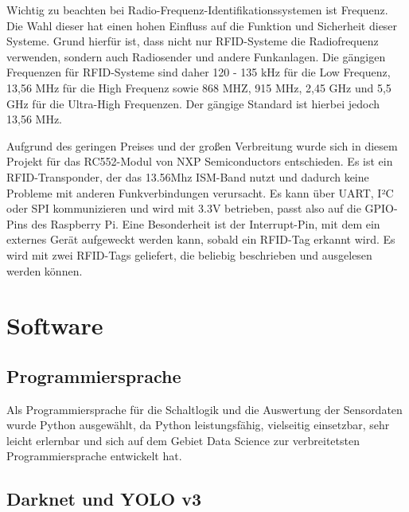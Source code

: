 Wichtig zu beachten bei Radio-Frequenz-Identifikationssystemen ist Frequenz. Die Wahl dieser hat einen hohen Einfluss auf die Funktion und Sicherheit dieser Systeme. Grund hierfür ist, dass nicht nur RFID-Systeme die Radiofrequenz verwenden, sondern auch Radiosender und andere Funkanlagen. Die gängigen Frequenzen für RFID-Systeme sind daher 120 - 135 kHz für die Low Frequenz, 13,56 MHz für die High Frequenz sowie 868 MHZ, 915 MHz, 2,45 GHz und 5,5 GHz für die Ultra-High Frequenzen. Der gängige Standard ist hierbei jedoch 13,56 MHz.\autocite[Vgl.][S. 34]{rfid}

Aufgrund des geringen Preises und der großen Verbreitung wurde sich in diesem Projekt für das RC552-Modul von NXP Semiconductors entschieden. Es ist ein RFID-Transponder, der das 13.56Mhz ISM-Band nutzt und dadurch keine Probleme mit anderen Funkverbindungen verursacht. Es kann über UART, I²C oder SPI kommunizieren und wird mit 3.3V betrieben, passt also auf die \ac{GPIO}-Pins des Raspberry Pi. Eine Besonderheit ist der Interrupt-Pin, mit dem ein externes Gerät aufgeweckt werden kann, sobald ein RFID-Tag erkannt wird. Es wird mit zwei RFID-Tags geliefert, die beliebig beschrieben und ausgelesen werden können. 



\section{Software}

							   
	


				

																																																							   
																																																																							   

\subsection{Programmiersprache}
Als Programmiersprache für die Schaltlogik und die Auswertung der Sensordaten wurde Python ausgewählt, da Python leistungsfähig, vielseitig einsetzbar, sehr leicht erlernbar und sich auf dem Gebiet Data Science zur verbreitetsten Programmiersprache entwickelt hat.\autocite[Vgl.][S. XIV]{Raschka} 



\subsection{Darknet und YOLO v3}

